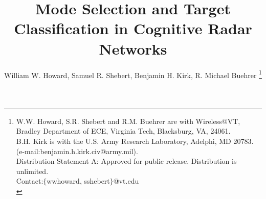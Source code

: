 \documentclass[journal,12pt,onecolumn,draftclsnofoot,]{IEEEtran}
\theoremstyle{definition}
\begin{document}
\title{Mode Selection and Target Classification in Cognitive Radar Networks}
\author{William W. Howard, Samuel R. Shebert, Benjamin H. Kirk, R. Michael Buehrer
\thanks{W.W. Howard, S.R. Shebert and R.M. Buehrer are with Wireless@VT, Bradley Department of ECE, Virginia Tech, Blacksburg, VA, 24061. \\ 
B.H. Kirk is with the U.S. Army Research Laboratory, Adelphi, MD 20783. (e-mail:{benjamin.h.kirk.civ}@army.mil).\\
Distribution Statement A: Approved for public release. Distribution is unlimited. \\
Contact:$\{${wwhoward, sshebert}$\}$@vt.edu  \\
}
}



\maketitle
{}
\end{document}
